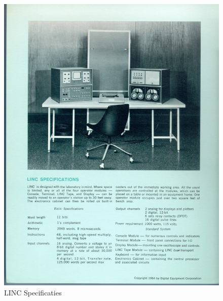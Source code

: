 \begin{figure}
\begin{center}
\includegraphics[width=\textwidth]{images/linc01.jpg}
\end{center}
\caption{LINC Specificaties}
\label{linc_specs}
\end{figure}

